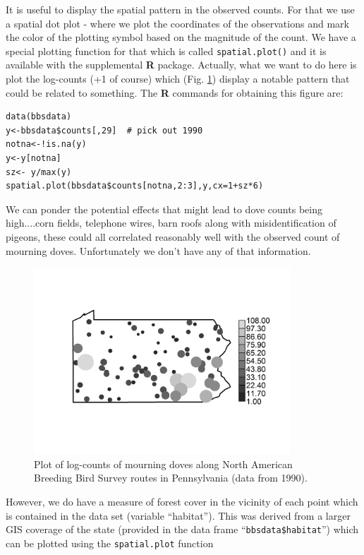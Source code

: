 It is useful to display the spatial pattern in the observed counts. For that we use a
spatial dot plot - where we plot the coordinates of the observations
and mark the color of the plotting symbol based on the magnitude of
the count.  We have a special plotting function for that which is
called \mbox{\tt spatial.plot()} and it is available with the
supplemental {\bf R} package.
Actually, what we want to do here is plot the
log-counts (+1 of course) which (Fig. \ref{glms.fig.padovecounts}) display a notable pattern that could
be related to something. The {\bf R} commands for obtaining this figure are:
{\small
\begin{verbatim}
data(bbsdata)
y<-bbsdata$counts[,29]  # pick out 1990
notna<-!is.na(y)
y<-y[notna]
sz<- y/max(y)
spatial.plot(bbsdata$counts[notna,2:3],y,cx=1+sz*6)
\end{verbatim}
}
 We can ponder the potential effects that
might lead to dove counts being high....corn fields, telephone wires,
barn roofs along with misidentification of pigeons, these could all
correlated reasonably well with the observed count of mourning doves.
Unfortunately we don't have any of that information.
\begin{figure}
\begin{center}
\includegraphics[height=2.75in]{Ch2-Bayes/figs/pacounts}
\end{center}
\caption{Plot of log-counts of mourning doves along North American Breeding Bird Survey routes in Pennsylvania (data from 1990).}
\label{glms.fig.padovecounts}
\end{figure}
However, we do have a measure of forest cover in the vicinity of each point
which is contained in the data set (variable ``habitat''). This was derived
from a larger GIS coverage of the state (provided in the data frame
``\mbox{\tt bbsdata\$habitat}'') which can be plotted using the \mbox{\tt spatial.plot} function
